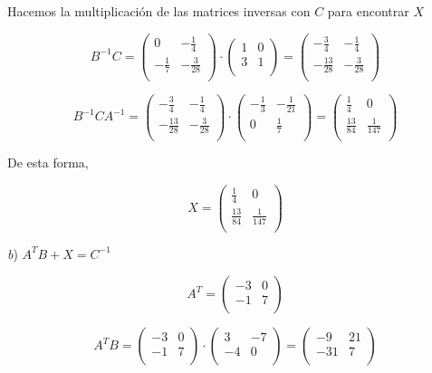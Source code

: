 \documentclass[11pt,a4paper]{article}
\begin{document}
\begin{enumerate}
Hacemos la multiplicación de las matrices inversas con $C$ para encontrar $X$

$$
B^{-1}C =
\begin{pmatrix} 
0 & -\frac{1}{4} \\
-\frac{1}{7}  & -\frac{3}{28} \\
\end{pmatrix}
\cdot 
\begin{pmatrix} 
1 & 0 \\
3  & 1 \\
\end{pmatrix}
=
\begin{pmatrix} 
-\frac{3}{4} & -\frac{1}{4} \\
-\frac{13}{28}  & -\frac{3}{28} \\
\end{pmatrix}
$$

$$
B^{-1}CA^{-1} =
\begin{pmatrix} 
-\frac{3}{4} & -\frac{1}{4} \\
-\frac{13}{28}  & -\frac{3}{28} \\
\end{pmatrix}
\cdot
\begin{pmatrix} 
-\frac{1}{3} & -\frac{1}{21} \\
0  & \frac{1}{7} \\
\end{pmatrix}
=
\begin{pmatrix}
\frac{1}{4} & 0 \\
\frac{13}{84}  & \frac{1}{147} \\
\end{pmatrix}
$$

De esta forma,

$$
X = 
\begin{pmatrix} 
\frac{1}{4} & 0 \\
\frac{13}{84}  & \frac{1}{147} \\
\end{pmatrix}
$$


\textit{b}) $A^{T}B + X = C^{-1}$

$$
A^{T} = 
\begin{pmatrix} 
-3 & 0 \\
-1  & 7 \\
\end{pmatrix}
$$

$$
A^{T}B = 
\begin{pmatrix} 
-3 & 0 \\
-1  & 7 \\
\end{pmatrix}
\cdot
\begin{pmatrix} 
3 & -7 \\
-4  & 0 \\
\end{pmatrix}
=
\begin{pmatrix} 
-9 & 21 \\
-31  & 7 \\
\end{pmatrix}
$$


\end{enumerate}
\end{document}
